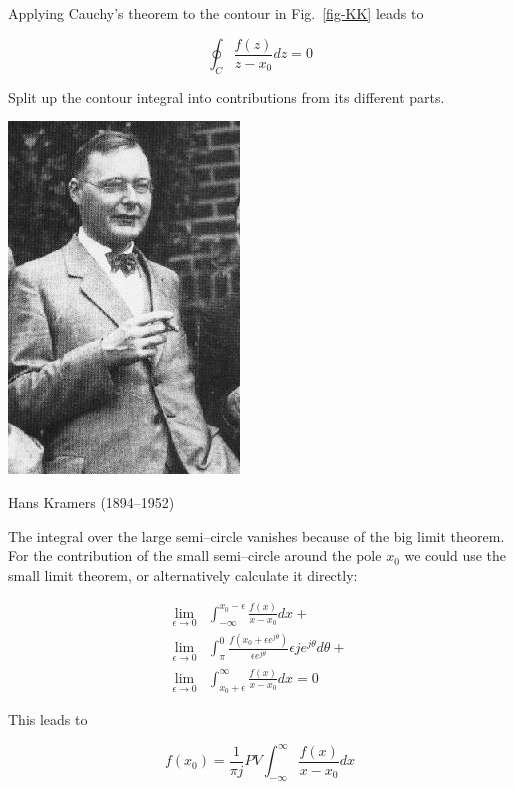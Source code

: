Applying Cauchy's theorem to the contour in Fig.~\ref{fig-KK} leads to

\begin{equation}
\oint_{{C}} \frac{f(z)}{z-x_0} dz = 0
\end{equation}

\begin{cue}
Split up the contour integral into contributions from its different parts.
\end{cue}

\begin{marginfigure}[1.0cm]
  \includegraphics[]{complex/figures/h_kramers}
  \caption{Hans Kramers (1894–1952)}
\end{marginfigure}

The integral over the large semi--circle vanishes because of the big limit theorem. For the contribution of the small semi--circle around the pole $x_0$ we could use the small limit theorem, or alternatively calculate it directly:

\begin{align}
\lim_{\epsilon \to 0} & \int_{- \infty}^{x_0-\epsilon} \frac{f(x)}{x-x_0}dx + \nonumber \\
\lim_{\epsilon \to 0} & \int_{\pi}^0 \frac{f(x_0+\epsilon e^{j \theta})}{\epsilon e^{j\theta}} \epsilon j e^{j \theta} d \theta + \nonumber \\
\lim_{\epsilon \to 0} & \int_{x_0+\epsilon}^{\infty} \frac{f(x)}{x-x_0}dx = 0
\end{align} 

This leads to 

\begin{equation}
f(x_0) = \frac{1}{\pi j} PV \int_{- \infty}^{\infty} \frac{f(x)}{x-x_0}dx
\label{eq-kk-1}
\end{equation} 

